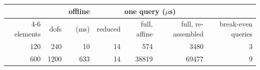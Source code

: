 \begin{tabular}{rrrrrrr}
\toprule
 & & offline & \multicolumn{3}{c}{one query ($\mu$s)} & \\
\cmidrule(lr){4-6}
elements & dofs & (ms) & reduced & full, affine & full, re-assembled & break-even queries \\
\midrule
120 & 240 & 10 & 14 & 574 & 3480 & 3 \\
600 & 1200 & 633 & 14 & 38819 & 69477 & 9 \\
\bottomrule
\end{tabular}
